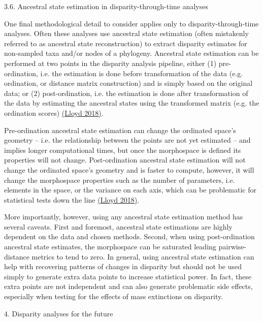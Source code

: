 \protect\hypertarget{anchor-3}{}{}3.6. Ancestral state estimation in
disparity-through-time analyses

One final methodological detail to consider applies only to
disparity-through-time analyses. Often these analyses use ancestral
state estimation (often mistakenly referred to as ancestral state
reconstruction) to extract disparity estimates for non-sampled taxa
and/or nodes of a phylogeny. Ancestral state estimation can be performed
at two points in the disparity analysis pipeline, either (1)
pre-ordination, i.e. the estimation is done before transformation of the
data (e.g. ordination, or distance matrix construction) and is simply
based on the original data; or (2) post-ordination, i.e. the estimation
is done after transformation of the data by estimating the ancestral
states using the transformed matrix (e.g. the ordination scores)
\href{https://paperpile.com/c/sTGYvp/53SJ}{(Lloyd 2018)}.

Pre-ordination ancestral state estimation can change the ordinated
space's geometry -- i.e. the relationship between the points are not yet
estimated -- and implies longer computational times, but once the
morphospace is defined its properties will not change. Post-ordination
ancestral state estimation will not change the ordinated space's
geometry and is faster to compute, however, it will change the
morphospace properties such as the number of parameters, i.e. elements
in the space, or the variance on each axis, which can be problematic for
statistical tests down the line
\href{https://paperpile.com/c/sTGYvp/53SJ}{(Lloyd 2018)}.

More importantly, however, using any ancestral state estimation method
has several caveats. First and foremost, ancestral state estimations are
highly dependent on the data and chosen methods. Second, when using
post-ordination ancestral state estimates, the morphospace can be
saturated leading pairwise-distance metrics to tend to zero. In general,
using ancestral state estimation can help with recovering patterns of
changes in disparity but should not be used simply to generate extra
data points to increase statistical power. In fact, these extra points
are not independent and can also generate problematic side effects,
especially when testing for the effects of mass extinctions on
disparity.

4. Disparity analyses for the future


